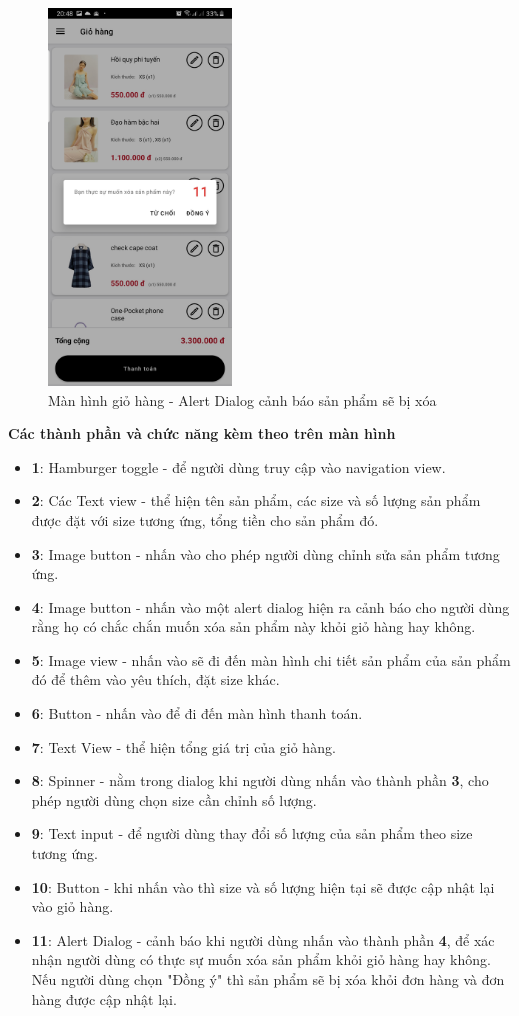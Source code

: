 \documentclass[12pt]{article}
\begin{document}
\begin{figure}[H]
    \centering
    \includegraphics[height=10cm]{images/29.png}
    \caption{Màn hình giỏ hàng - Alert Dialog cảnh báo sản phẩm sẽ bị xóa}
\end{figure}

\newpage
\indent \textbf{Các thành phần và chức năng kèm theo trên màn hình}
\begin{itemize}
    \item \textbf{1}: Hamburger toggle - để người dùng truy cập vào navigation view.
    \item \textbf{2}: Các Text view - thể hiện tên sản phẩm, các size và số lượng sản phẩm được đặt với size tương ứng, tổng tiền cho sản phẩm đó.
    \item \textbf{3}: Image button - nhấn vào cho phép người dùng chỉnh sửa sản phẩm tương ứng.
    \item \textbf{4}: Image button - nhấn vào một alert dialog hiện ra cảnh báo cho người dùng rằng họ có chắc chắn muốn xóa sản phẩm này khỏi giỏ hàng hay không.
    \item \textbf{5}: Image view - nhấn vào sẽ đi đến màn hình chi tiết sản phẩm của sản phẩm đó để thêm vào yêu thích, đặt size khác.
    \item \textbf{6}: Button - nhấn vào để đi đến màn hình thanh toán.
    \item \textbf{7}: Text View - thể hiện tổng giá trị của giỏ hàng.
    \item \textbf{8}: Spinner - nằm trong dialog khi người dùng nhấn vào thành phần \textbf{3}, cho phép người dùng chọn size cần chỉnh số lượng.
    \item \textbf{9}: Text input - để người dùng thay đổi số lượng của sản phẩm theo size tương ứng.
    \item \textbf{10}: Button - khi nhấn vào thì size và số lượng hiện tại sẽ được cập nhật lại vào giỏ hàng.
    \item \textbf{11}: Alert Dialog - cảnh báo khi người dùng nhấn vào thành phần \textbf{4}, để xác nhận người dùng có thực sự muốn xóa sản phẩm khỏi giỏ hàng hay không. Nếu người dùng chọn "Đồng ý" thì sản phẩm sẽ bị xóa khỏi đơn hàng và đơn hàng được cập nhật lại.
\end{itemize}
\end{document}

